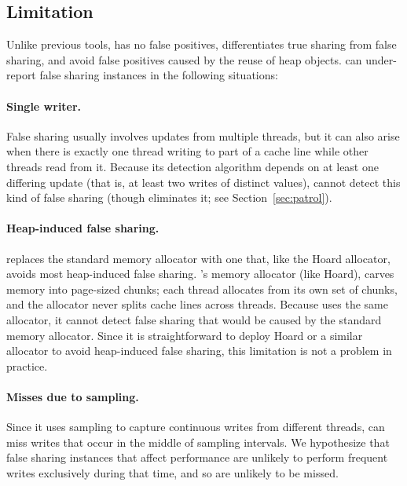 \subsection{Limitation}
\label{discussion:faultofdetect}

Unlike previous tools, \SheriffDetect{} has no false positives, differentiates true sharing from false sharing, and avoid false positives caused by the reuse of heap objects.
\SheriffDetect{} can under-report false sharing instances in the following situations:

\paragraph{Single writer.}
False sharing usually involves updates from multiple threads, but it can also arise when there is exactly one thread writing to part of a cache line while other threads read from it. Because its detection algorithm depends on at least one differing update (that is, at least two writes of distinct values), \SheriffDetect{} cannot detect this kind of false sharing (though \sheriffprotect{} eliminates it; see Section~\ref{sec:patrol}).

\paragraph{Heap-induced false sharing.}  
\sheriff{} replaces the standard memory allocator with one that, like the Hoard allocator, avoids most heap-induced false sharing. \sheriff{}'s memory allocator (like Hoard), carves memory into page-sized chunks; each thread allocates
from its own set of chunks, and the allocator never splits cache lines across threads. Because \SheriffDetect{} uses the same allocator, it cannot detect false sharing that would be caused by the standard memory allocator. Since it is straightforward to deploy Hoard or a similar allocator to avoid heap-induced false sharing, this limitation is not a problem in practice.

\paragraph{Misses due to sampling.}  Since it uses sampling to
  capture continuous writes from different threads, \SheriffDetect{} can miss writes that occur in the middle of sampling intervals. We hypothesize that false sharing instances that affect performance are unlikely to perform frequent writes exclusively during that time, and so are unlikely to be missed.
